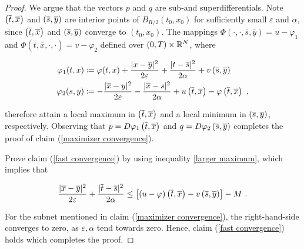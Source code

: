 \begin{lemma}
\begin{proof}
	 		We argue that the vectors $ p $ and $ q $ are sub-and superdifferentials. Note $ \left(\overline{t}, \overline{x}\right) $ and $ \left(\overline{s}, \overline{y}\right) $ are interior points of $ \overline{B}_{R / 2}(t_0, x_0) $ for sufficiently small $ \varepsilon $ and $ \alpha $, since $ \left(\overline{t}, \overline{x}\right) $ and $ \left(\overline{s}, \overline{y}\right) $ converge to $ (t_0, x_0) $. The mappings $ \Phi(\cdot, \cdot, \overline{s}, \overline{y}) = u - \varphi_1 $ and $ \Phi(\overline{t}, \overline{x}, \cdot, \cdot) =  v - \varphi_2 $ defined over $ \left(0, T\right) \times \mathbb{R}^N $, where
	 		
	 		\begin{align*}
	 			\varphi_1(t, x)  &\coloneqq \varphi(t, x) + \frac{\lvert x - \overline{y} \rvert^2}{2 \varepsilon} + \frac{\lvert t - \overline{s} \rvert^2}{2 \alpha} + v\left(\overline{s}, \overline{y}\right) \\
	 			\varphi_2(s, y) &\coloneqq - \frac{\lvert \overline{x} - y \rvert^2}{2 \varepsilon} - \frac{\lvert \overline{x} - s \rvert^2}{2 \alpha} + u\left(\overline{t}, \overline{x}\right) - \varphi\left(\overline{t}, \overline{x}\right) \ ,
	 		\end{align*}
	 		
	 		therefore attain a local maximum in $ \left(\overline{t}, \overline{x}\right) $ and a local minimum in $ \left(\overline{s}, \overline{y}\right) $, respectively. Observing that $ p = D\varphi_1\left(\overline{t}, \overline{x}\right) $ and $ q = D\varphi_2\left(\overline{s}, \overline{y}\right) $ completes the proof of claim (\ref{maximizer convergence}).
	 		
	 		Prove claim (\ref{fast convergence}) by using inequality \eqref{larger maximum}, which implies that
	 		
	 		\begin{equation*}
	 			 \frac{\lvert \overline{x} - \overline{y} \rvert^2}{2 \varepsilon} + \frac{\lvert \overline{t} - \overline{s} \rvert^2}{2 \alpha} \leq \left[(u - \varphi)\left(\overline{t}, \overline{x}\right) - v\left(\overline{s}, \overline{y}\right) \right] - M \ .
	 		\end{equation*}
	 		
	 		For the subnet mentioned in claim (\ref{maximizer convergence}), the right-hand-side converges to zero, as $ \varepsilon, \alpha $ tend towards zero. Hence, claim (\ref{fast convergence}) holds which completes the proof.
	\end{proof}
\end{lemma}